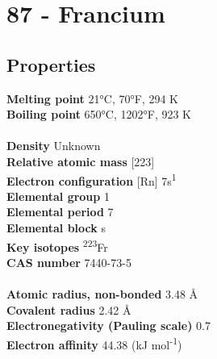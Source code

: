 \section{87 - Francium}
\label{sec:elem-francium}
\subsection{Properties}
\textbf{Melting point} 21°C, 70°F, 294 K\\
\textbf{Boiling point} 650°C, 1202°F, 923 K\\
\\
\textbf{Density} Unknown\\
\textbf{Relative atomic mass} [223]\\
\textbf{Electron configuration} [Rn] 7s\textsuperscript{1}\\
\textbf{Elemental group} 1\\
\textbf{Elemental period} 7\\
\textbf{Elemental block} s\\
\textbf{Key isotopes} \textsuperscript{223}Fr\\
\textbf{CAS number} 7440-73-5\\
\\
\textbf{Atomic radius, non-bonded} 3.48 Å\\
\textbf{Covalent radius} 2.42 Å\\
\textbf{Electronegativity (Pauling scale)} 0.7\\
\textbf{Electron affinity} 44.38 (kJ mol\textsuperscript{-1})\\